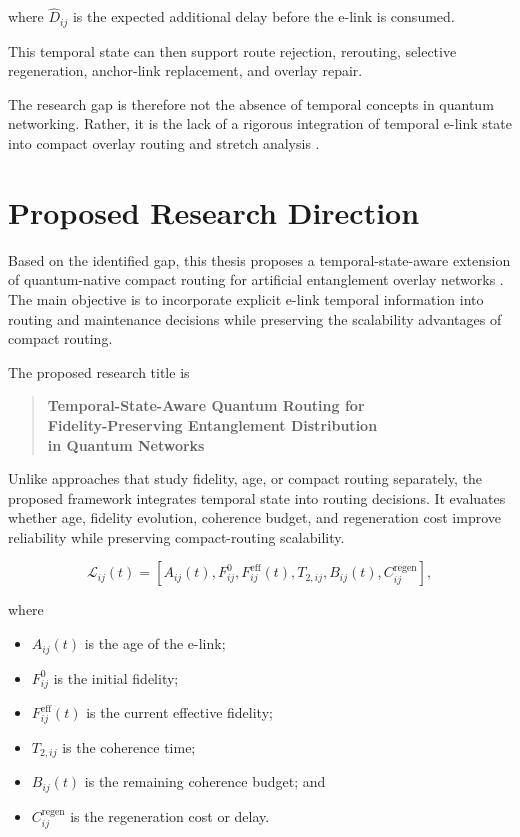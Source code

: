 where $\widehat{D}_{ij}$ is the expected additional delay before the e-link is consumed.

This temporal state can then support route rejection, rerouting, selective regeneration, anchor-link replacement, and overlay repair.

The research gap is therefore not the absence of temporal concepts in quantum networking. Rather, it is the lack of a rigorous integration of temporal e-link state into compact overlay routing and stretch analysis \cite{caleffi2025quantumarchitecture,ercetin2026fidelityage,ceran2026age}.

\section{Proposed Research Direction}

Based on the identified gap, this thesis proposes a temporal-state-aware extension of quantum-native compact routing for artificial entanglement overlay networks \cite{caleffi2025quantumarchitecture,ercetin2026fidelityage,ceran2026age}. The main objective is to incorporate explicit e-link temporal information into routing and maintenance decisions while preserving the scalability advantages of compact routing.

The proposed research title is

\begin{quote}
\centering
\textbf{Temporal-State-Aware Quantum Routing for\\
Fidelity-Preserving Entanglement Distribution\\
in Quantum Networks}
\end{quote}

Unlike approaches that study fidelity, age, or compact routing separately,
the proposed framework integrates temporal state into routing decisions. It
evaluates whether age, fidelity evolution, coherence budget, and regeneration
cost improve reliability while preserving compact-routing scalability.

\begin{equation}
    \mathcal{L}_{ij}(t)
    =
    \left[
    A_{ij}(t),
    F_{ij}^{0},
    F_{ij}^{\mathrm{eff}}(t),
    T_{2,ij},
    B_{ij}(t),
    C_{ij}^{\mathrm{regen}}
    \right],
\end{equation}

where

\begin{itemize}
    \item $A_{ij}(t)$ is the age of the e-link;
    \item $F_{ij}^{0}$ is the initial fidelity;
    \item $F_{ij}^{\mathrm{eff}}(t)$ is the current effective fidelity;
    \item $T_{2,ij}$ is the coherence time;
    \item $B_{ij}(t)$ is the remaining coherence budget; and
    \item $C_{ij}^{\mathrm{regen}}$ is the regeneration cost or delay.
\end{itemize}

